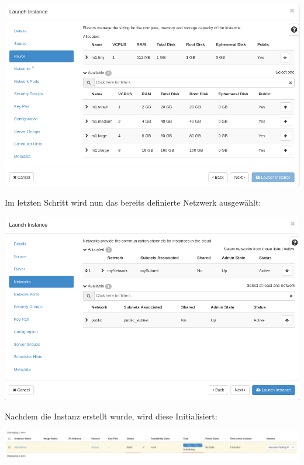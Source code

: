 \begin{minipage}{\linewidth}
	\centering
	\includegraphics[width=.85\linewidth]{images/instanceflavor}
\end{minipage}

Im letzten Schritt wird nun das bereits definierte Netzwerk ausgewählt:

\begin{minipage}{\linewidth}
	\centering
	\includegraphics[width=.85\linewidth]{images/instancenetwork}
\end{minipage}

Nachdem die Instanz erstellt wurde, wird diese Initialisiert:

\begin{minipage}{\linewidth}
	\centering
	\includegraphics[width=1\linewidth]{images/instancestart}
\end{minipage}

